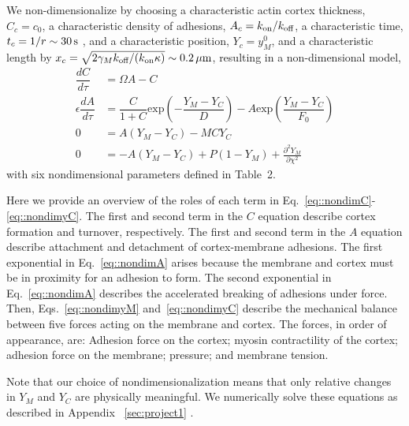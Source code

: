 We non-dimensionalize by choosing a characteristic actin cortex thickness, $C_c= c_0$, a characteristic density of adhesions, $A_c =  k_{\mbox{\scriptsize on}}/k_{\mbox{\scriptsize off}}$, a characteristic time, $t_c=1/r \sim 30\,\mbox{s}$ \cite{Fritzsche:2014jw}, and a characteristic position, $Y_c=y_M^0$, and a characteristic length by $x_c =\sqrt{2 \gamma_M k_{\mbox{\scriptsize off}}/(k_{\mbox{\scriptsize on}} \kappa)} \sim 0.2\,\mu\mbox{m}$, resulting in a non-dimensional model, 
\begin{align}
\dfrac{dC}{d \tau}  & =  \Omega A - C\label{eq::nondimC}\\
\epsilon\dfrac{dA}{ d \tau}  & =  \dfrac{C}{1+C} \mbox{exp}\left(-\dfrac{Y_M-Y_C}{D}\right) - A \mbox{exp} \left(\dfrac{Y_M-Y_C}{F_0} \right) \label{eq::nondimA}\\
0 & = A(Y_M-Y_C) - MCY_C \label{eq::nondimyM}\\
0 & = -A(Y_M-Y_C) + P(1-Y_M) +  \frac{\partial^2 Y_M}{\partial \chi^2} \label{eq::nondimyC}
\end{align}
with six nondimensional parameters defined in Table~2. 

Here we provide an overview of the roles of each term in Eq.~\ref{eq::nondimC}-\ref{eq::nondimyC}. The first and second term in the $C$ equation describe cortex formation and turnover, respectively. The first and second term in the $A$ equation describe attachment and detachment of cortex-membrane adhesions. The first exponential in Eq.~\ref{eq::nondimA} arises because the membrane and cortex must be in proximity for an adhesion to form. The second exponential in Eq.~\ref{eq::nondimA} describes the accelerated breaking of adhesions under force. Then, Eqs.~\ref{eq::nondimyM} and~\ref{eq::nondimyC} describe the mechanical balance between five forces acting on the membrane and cortex. The forces, in order of appearance, are: Adhesion force on the cortex; myosin contractility of the cortex; adhesion force on the membrane; pressure; and membrane tension.

Note that our choice of nondimensionalization means that only relative changes in $Y_M$ and $Y_C$ are physically meaningful. We numerically solve these equations as described in Appendix ~\ref{sec:project1} \cite{wise07}. 




